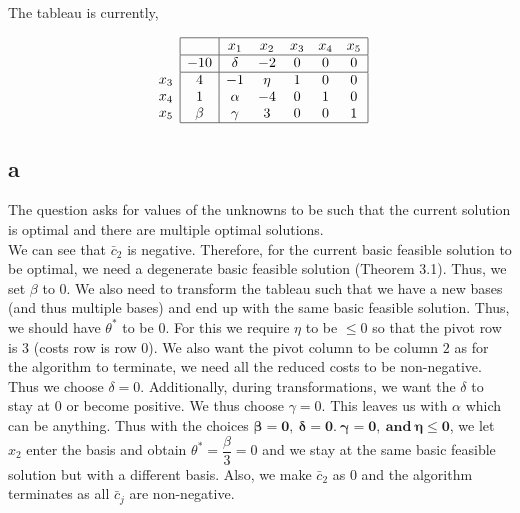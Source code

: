 The tableau is currently, 


$$
\begin{array}{c}
\\
 \\
x_3 \\
x_4 \\ 
x_5 \\
\end{array}
\begin{array}{|c|ccccc|}
    \hline
    & x_1 & x_2 & x_3 & x_4 & x_5\\ \hline
  -10 & \delta & -2 & 0 & 0 & 0\\ \hline
  4 & -1 & \eta & 1 & 0 & 0\\
  1 & \alpha & -4 & 0 & 1 & 0\\
  \beta & \gamma & 3 & 0 & 0 & 1\\\hline
\end{array}
$$

\subsection*{a}
The question asks for values of the unknowns to be such that the current solution is optimal and there are multiple optimal solutions. \\

We can see that $\bar{c}_2$ is negative. Therefore, for the current basic feasible solution to be optimal, we need a degenerate basic feasible solution (Theorem 3.1). Thus, we set $\beta$ to $0$. We also need to transform the tableau such that we have a new bases (and thus multiple bases) and end up with the same basic feasible solution. Thus, we should have $\theta^*$ to be $0$. For this we require $\eta$ to be $\le 0$ so that the pivot row is $3$ (costs row is row 0). We also want the pivot column to be column $2$ as for the algorithm to terminate, we need all the reduced costs to be non-negative. Thus we choose $\delta = 0$. Additionally, during transformations, we want the $\delta$ to stay at 0 or become positive. We thus choose $\gamma = 0$. This leaves us with $\alpha$ which can be anything. Thus with the choices $\boldsymbol{\beta = 0,\: \delta = 0.\: \gamma = 0,\: \text{and}\: \eta \le 0}$, we let $x_2$ enter the basis and obtain $\theta^* = \dfrac{\beta}{3} = 0$ and we stay at the same basic feasible solution but with a different basis. Also, we make $\bar{c}_2$ as 0 and the algorithm terminates as all $\bar{c}_j$ are non-negative. 



